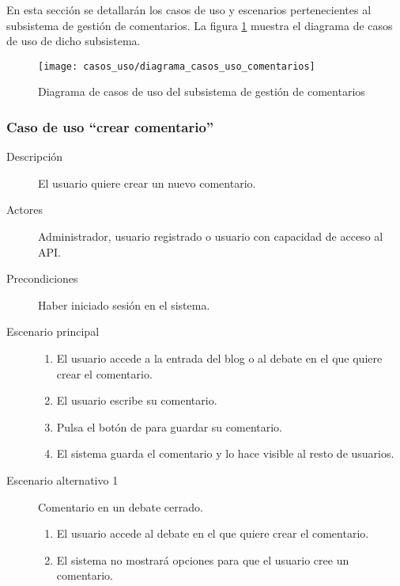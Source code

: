 En esta sección se detallarán los casos de uso y escenarios pertenecientes al subsistema de gestión de comentarios. La figura \ref{fig:casos_uso_subsistema_comentarios} muestra el diagrama de casos de uso de dicho subsistema.

\begin{figure}[h]
\centering
\texttt{[image: casos\_uso/diagrama\_casos\_uso\_comentarios]}
\caption{Diagrama de casos de uso del subsistema de gestión de comentarios}
\label{fig:casos_uso_subsistema_comentarios}
\end{figure}


\subsubsection{Caso de uso ``crear comentario''}
\begin{description}
\item[Descripción] El usuario quiere crear un nuevo comentario.
\item[Actores] Administrador, usuario registrado o usuario con capacidad de acceso al API.
\item[Precondiciones] Haber iniciado sesión en el sistema.
\item[Escenario principal] \hfill
						 	\begin{enumerate}
							\item El usuario accede a la entrada del blog o al debate en el que quiere crear el comentario.
							\item El usuario escribe su comentario.
							\item Pulsa el botón de para guardar su comentario.
							\item El sistema guarda el comentario y lo hace visible al resto de usuarios.
							\end{enumerate}
\item[Escenario alternativo 1] Comentario en un  debate cerrado.
							\begin{enumerate}
							\item El usuario accede al debate en el que quiere crear el comentario.
							\item El sistema no mostrará opciones para que el usuario cree un comentario.
							\end{enumerate}
\end{description}


